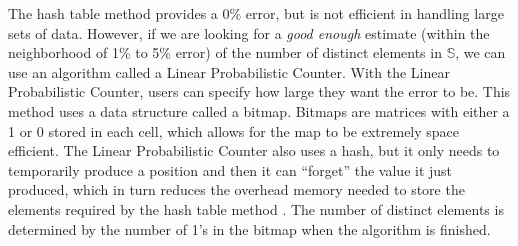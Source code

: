 \documentclass{article}
\begin{document}
\indent The hash table method provides a 0\% error, but is not efficient in handling large sets of data. 
However, if we are looking for a \textit{good enough} estimate (within the neighborhood of 1\% to 5\% error) of the number of distinct elements in $\mathbb{S}$, we can use an algorithm called a Linear Probabilistic Counter.
With the Linear Probabilistic Counter, users can specify how large they want the error to be.
This method uses a data structure called a bitmap. 
Bitmaps are matrices with either a 1 or 0 stored in each cell, which allows for the map to be extremely space efficient. 
The Linear Probabilistic Counter also uses a hash, but it only needs to temporarily produce a position and then it can ``forget'' the value it just produced, which in turn reduces the overhead memory needed to store the elements required by the hash table method \cite{Whang}. 
The number of distinct elements is determined by the number of 1's in the bitmap when the algorithm is finished.\\
\end{document}

